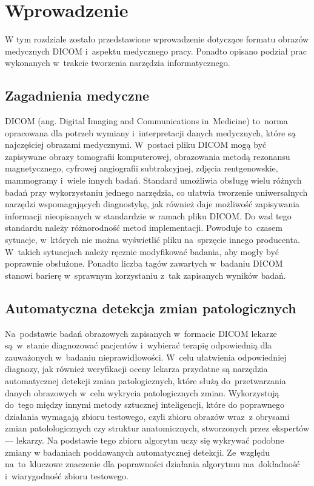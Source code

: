 \documentclass[a4paper,11pt,twoside,openright]{report}
\theoremstyle{definition}
\begin{document}
\chapter {Wprowadzenie}

W tym rozdziale zostało przedstawione wprowadzenie dotyczące formatu obrazów
medycznych DICOM i~aspektu medycznego pracy.
Ponadto opisano podział prac wykonanych w~trakcie tworzenia
narzędzia informatycznego.

\section {Zagadnienia medyczne}

DICOM (ang. Digital Imaging and Communications in~Medicine) \cite{DICOM} to~norma
opracowana dla potrzeb wymiany i~interpretacji danych medycznych, które są
najczęściej obrazami medycznymi. W~postaci pliku DICOM mogą być zapisywane obrazy
tomografii komputerowej, obrazowania metodą rezonansu magnetycznego, cyfrowej
angiografii subtrakcyjnej, zdjęcia rentgenowskie, mammogramy i~wiele innych badań.
Standard umożliwia obsługę wielu różnych badań przy wykorzystaniu jednego narzędzia,
co ułatwia tworzenie uniwersalnych narzędzi wspomagających diagnostykę, jak również
daje możliwość zapisywania informacji nieopisanych w standardzie w ramach pliku DICOM.
Do wad tego standardu należy różnorodność metod implementacji. Powoduje to~czasem
sytuacje, w~których nie można wyświetlić pliku na~sprzęcie innego producenta.
W~takich sytuacjach należy ręcznie
modyfikować badania, aby mogły być poprawnie obsłużone. Ponadto liczba tagów zawartych w~badaniu
DICOM stanowi barierę w~sprawnym korzystaniu z~tak zapisanych wyników badań.

\section {Automatyczna detekcja zmian patologicznych}

Na~podstawie badań obrazowych zapisanych w~formacie DICOM lekarze są~w~stanie diagnozować
pacjentów i~wybierać terapię odpowiednią dla zauważonych w~badaniu nieprawidłowości.
W~celu ułatwienia odpowiedniej diagnozy, jak również weryfikacji oceny lekarza
przydatne są narzędzia automatycznej detekcji zmian patologicznych,
które służą do~przetwarzania danych obrazowych w~celu
wykrycia patologicznych zmian. Wykorzystują do~tego między innymi metody sztucznej
inteligencji, które do poprawnego działania wymagają zbioru testowego, czyli zbioru obrazów
wraz~z obrysami zmian patolologicznych czy struktur anatomicznych, stworzonych przez
ekspertów --- lekarzy. Na podstawie tego zbioru algorytm uczy się
wykrywać podobne zmiany w badaniach poddawanych automatycznej detekcji.
Ze~względu na~to~kluczowe znaczenie dla poprawności działania algorytmu ma~dokładność i~wiarygodność zbioru testowego.
\end{document}
